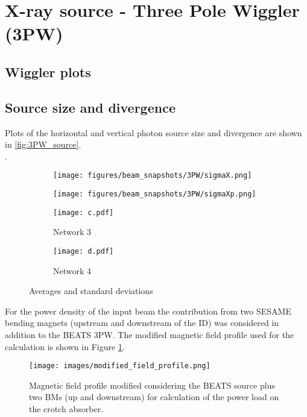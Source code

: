 \section{X-ray source - Three Pole Wiggler (3PW)}
\subsection{Wiggler plots}

\subsection{Source size and divergence}
Plots of the horizontal and vertical photon source size and divergence are shown in \ref{fig:3PW_source}. \\.

\begin{figure*}  %
\begin{subfigure}{0.45\textwidth}
\texttt{[image: figures/beam\_snapshots/3PW/sigmaX.png]}
\end{subfigure}
\hfill %
\begin{subfigure}{0.45\textwidth}
\texttt{[image: figures/beam\_snapshots/3PW/sigmaXp.png]}
\end{subfigure}

\bigskip  %
\begin{subfigure}{0.45\textwidth}
\texttt{[image: c.pdf]}
\caption{Network  3}
\end{subfigure}
\hfill %
\begin{subfigure}{0.45\textwidth}
\texttt{[image: d.pdf]}
\caption{Network  4}
\end{subfigure}

\caption{Averages and standard deviations} %
\end{figure*}

For the power density of the input beam the contribution from two SESAME bending magnets (upstream and downstream of the ID) was considered in addition to the BEATS 3PW. The modified magnetic field profile used for the calculation is shown in Figure \ref{fig:modifiedfieldprofile}. \\
\begin{figure}[ht]
\centering
\texttt{[image: images/modified\_field\_profile.png]}
\caption{\label{fig:modifiedfieldprofile} Magnetic field profile modified considering the BEATS source plus two BMs (up and downstream) for calculation of the power load on the crotch absorber.}
\end{figure}